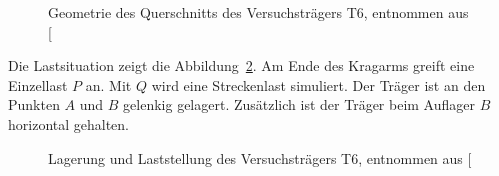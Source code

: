 \documentclass[
  11pt,
  letterpaper,
]{scrreprt}
\begin{document}
\begin{figure}[H]


\caption{\label{fig-geometrie_qs_t6}Geometrie des Querschnitts des
Versuchsträgers T6, entnommen aus
{[}\citeproc{ref-sigrist_versuche_1993}{5}{]}}

\end{figure}%

Die Lastsituation zeigt die Abbildung~\ref{fig-last_t6}. Am Ende des
Kragarms greift eine Einzellast \(P\) an. Mit \(Q\) wird eine
Streckenlast simuliert. Der Träger ist an den Punkten \(A\) und \(B\)
gelenkig gelagert. Zusätzlich ist der Träger beim Auflager \(B\)
horizontal gehalten.

\begin{figure}[H]


\caption{\label{fig-last_t6}Lagerung und Laststellung des
Versuchsträgers T6, entnommen aus
{[}\citeproc{ref-sigrist_versuche_1993}{5}{]}}

\end{figure}%
\end{document}
